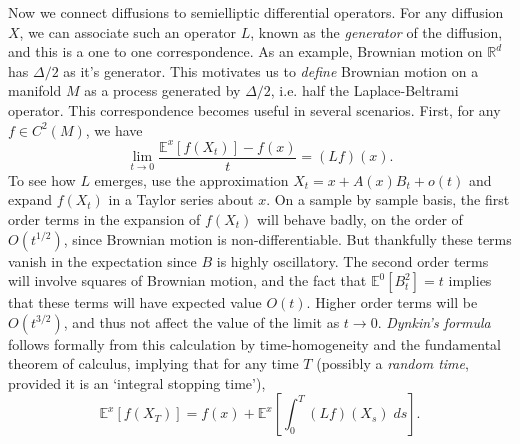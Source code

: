 \documentclass[12pt]{article}
\newcommand*{\R}{\mathbb{R}}
\begin{document}
Now we connect diffusions to semielliptic differential operators. For any diffusion $X$, we can associate such an operator $L$, known as the \emph{generator} of the diffusion, and this is a one to one correspondence. As an example, Brownian motion on $\R^d$ has $\Delta / 2$ as it's generator. This motivates us to \emph{define} Brownian motion on a manifold $M$ as a process generated by $\Delta/2$, i.e. half the Laplace-Beltrami operator. This correspondence becomes useful in several scenarios. First, for any $f \in C^2(M)$, we have
%
\[ \lim_{t \to 0} \frac{\mathbb{E}^x[f(X_t)] - f(x)}{t} = (Lf)(x). \]
%
To see how $L$ emerges, use the approximation $X_t = x + A(x) B_t + o(t)$ and expand $f(X_t)$ in a Taylor series about $x$. On a sample by sample basis, the first order terms in the expansion of $f(X_t)$ will behave badly, on the order of $O(t^{1/2})$, since Brownian motion is non-differentiable. But thankfully these terms vanish in the expectation since $B$ is highly oscillatory. The second order terms will involve squares of Brownian motion, and the fact that $\mathbb{E}^0[B_t^2] = t$ implies that these terms will have expected value $O(t)$. Higher order terms will be $O(t^{3/2})$, and thus not affect the value of the limit as $t \to 0$.
%
%
%
\emph{Dynkin's formula} follows formally from this calculation by time-homogeneity and the fundamental theorem of calculus, implying that for any time $T$ (possibly a \emph{random time}, provided it is an `integral stopping time'),
%
\[ \mathbb{E}^x[f(X_T)] = f(x) + \mathbb{E}^x \left[ \int_0^T (Lf)(X_s)\; ds \right]. \]
\end{document}
